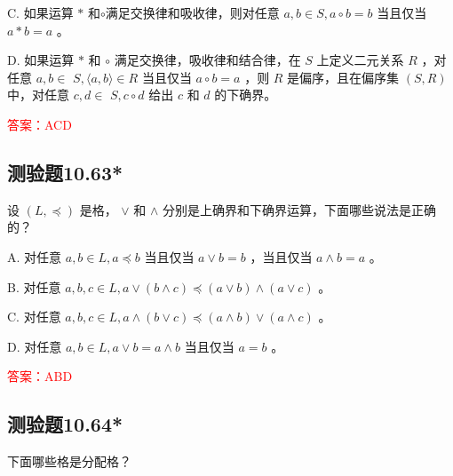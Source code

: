 \documentclass[UTF8, heading=true]{ctexart}
\begin{document}
C. 如果运算 $*$ 和$\circ$满足交换律和吸收律，则对任意 $a, b \in S, a \circ b=b$ 当且仅当 $a * b=a$ 。

D. 如果运算 $*$ 和 $\circ$ 满足交换律，吸收律和结合律，在 $S$ 上定义二元关系 $R$ ，对任意 $a, b \in$
$S,\langle a, b\rangle \in R$ 当且仅当 $a \circ b=a$ ，则 $R$ 是偏序，且在偏序集 $(S, R)$ 中，对任意 $c, d \in$ $S, c \circ d$ 给出 $c$ 和 $d$ 的下确界。


\textcolor{red}{答案：ACD}

\subsection{测验题10.63*}

设 $(L, \preceq)$ 是格， $\vee$ 和 $\wedge$ 分别是上确界和下确界运算，下面哪些说法是正确的？

A. 对任意 $a, b \in L, a \preceq b$ 当且仅当 $a \vee b=b$ ，当且仅当 $a \wedge b=a$ 。

B. 对任意 $a, b, c \in L, a \vee(b \wedge c) \preceq(a \vee b) \wedge(a \vee c)$ 。

C. 对任意 $a, b, c \in L, a \wedge(b \vee c) \preceq(a \wedge b) \vee(a \wedge c)$ 。

D. 对任意 $a, b \in L, a \vee b=a \wedge b$ 当且仅当 $a=b$ 。

\textcolor{red}{答案：ABD}

\subsection{测验题10.64*}

下面哪些格是分配格？
\end{document}
